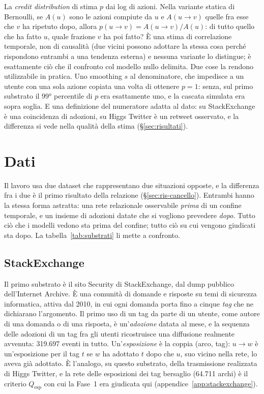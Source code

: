 \documentclass[11pt,a4paper]{article}
\newcommand{\Qesp}{Q_{\mathrm{esp}}}
\newcommand{\sx}{StackExchange}
\newcommand{\hg}{Higgs Twitter}
\begin{document}
La \emph{credit distribution} di \citet{goyal2010} stima $p$ dai log di azioni. Nella variante statica di Bernoulli, se $A(u)$ sono le azioni compiute da $u$ e $A(u \to v)$ quelle fra esse che $v$ ha ripetuto dopo, allora $p(u \to v) = A(u \to v) / A(u)$: di tutto quello che ha fatto $u$, quale frazione $v$ ha poi fatto? È una stima di correlazione temporale, non di causalità (due vicini possono adottare la stessa cosa perché rispondono entrambi a una tendenza esterna) e nessuna variante lo distingue; è esattamente ciò che il confronto col modello nullo delimita. Due cose la rendono utilizzabile in pratica. Uno smoothing $s$ al denominatore, che impedisce a un utente con una sola azione copiata una volta di ottenere $p = 1$: senza, sul primo substrato il 99° percentile di $p$ era esattamente uno, e la cascata simulata era sopra soglia. E una definizione del numeratore adatta al dato: su \sx{} è una coincidenza di adozioni, su \hg{} è un retweet osservato, e la differenza si vede nella qualità della stima (\S\ref{sec:risultati}).

\clearpage
\section{Dati}
\label{sec:dati}

Il lavoro usa due dataset che rappresentano due situazioni opposte, e la differenza fra i due è il primo risultato della relazione (\S\ref{sec:ris-cancello}). Entrambi hanno la stessa forma astratta: una rete relazionale osservabile \emph{prima} di un confine temporale, e un insieme di adozioni datate che si vogliono prevedere \emph{dopo}. Tutto ciò che i modelli vedono sta prima del confine; tutto ciò su cui vengono giudicati sta dopo. La tabella~\ref{tab:substrati} li mette a confronto.

\subsection{StackExchange}
Il primo substrato è il sito Security di StackExchange, dal dump pubblico dell'Internet Archive. È una comunità di domande e risposte su temi di sicurezza informatica, attiva dal 2010, in cui ogni domanda porta fino a cinque \emph{tag} che ne dichiarano l'argomento. Il primo uso di un tag da parte di un utente, come autore di una domanda o di una risposta, è un'\emph{adozione} datata al mese, e la sequenza delle adozioni di un tag fra gli utenti ricostruisce una diffusione realmente avvenuta: 319.697 eventi in tutto. Un'\emph{esposizione} è la coppia (arco, tag): $u \to w$ è un'esposizione per il tag $t$ se $w$ ha adottato $t$ dopo che $u$, suo vicino nella rete, lo aveva già adottato. È l'analogo, su questo substrato, della trasmissione realizzata di \hg{}, e la rete delle esposizioni dei tag bersaglio (64.711 archi) è il criterio $\Qesp$ con cui la Fase~1 era giudicata qui (appendice~\ref{app:stackexchange}).
\end{document}
